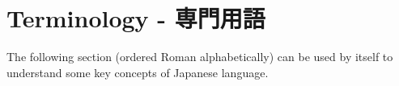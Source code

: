 \chapter{Terminology - 専門用語}

The following section (ordered Roman alphabetically) can be used by itself to
understand some key concepts of Japanese language. 


